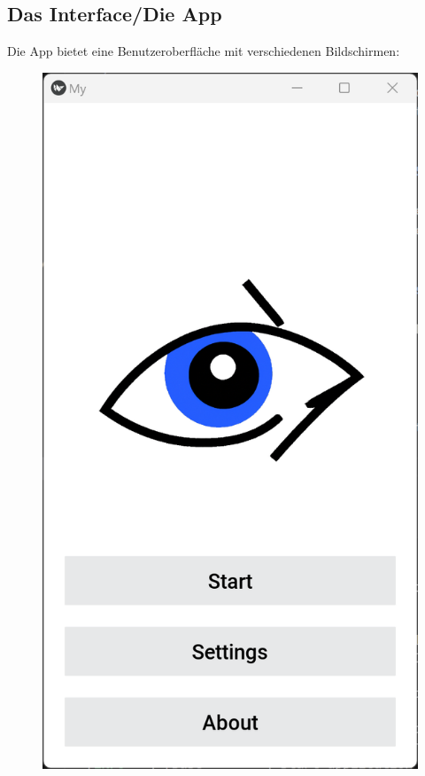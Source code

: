 \subsection{Das Interface/Die App}
\label{ssec:interface}

Die App bietet eine Benutzeroberfläche mit verschiedenen Bildschirmen:

\begin{figure}[h]
	\centering
	\begin{minipage}[b]{0.22\textwidth}
		\includegraphics[width=\linewidth]{images/mainscreen.png}

\end{minipage}
\end{figure}
